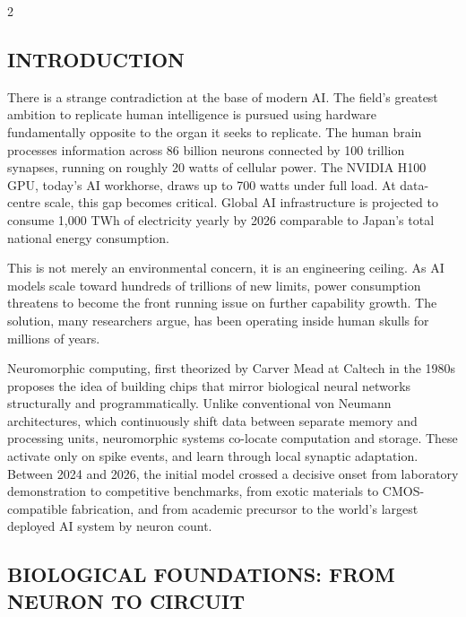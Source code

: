 \begin{multicols}{2}
\begin{abstract}
    \vspace{1em}
    {\justifying\noindent\textbf{Keywords:} Neuromorphic Computing, Spiking Neural Networks, Surrogate Gradient, MFT Training, SpikeYOLO, SpikingYOLOX, Memristor, ANN-to-SNN Conversion, Loihi 2, Hala Point, Event-Driven AI.\par}
  \end{abstract}

  \subsection*{\centering\uppercase{INTRODUCTION}}
  There is a strange contradiction at the base of modern AI. The field's greatest ambition to replicate human intelligence is pursued using hardware fundamentally opposite to the organ it seeks to replicate. The human brain processes information across 86 billion neurons connected by 100 trillion synapses, running on roughly 20 watts of cellular power. The NVIDIA H100 GPU, today's AI workhorse, draws up to 700 watts under full load. At data-centre scale, this gap becomes critical. Global AI infrastructure is projected to consume 1,000 TWh of electricity yearly by 2026 comparable to Japan's total national energy consumption.

  \noindent
  This is not merely an environmental concern, it is an engineering ceiling. As AI models scale toward hundreds of trillions of new limits, power consumption threatens to become the front running issue on further capability growth. The solution, many researchers argue, has been operating inside human skulls for millions of years.

  \noindent
  Neuromorphic computing, first theorized by Carver Mead at Caltech in the 1980s proposes the idea of building chips that mirror biological neural networks structurally and programmatically. Unlike conventional von Neumann architectures, which continuously shift data between separate memory and processing units, neuromorphic systems co-locate computation and storage. These activate only on spike events, and learn
  through local synaptic adaptation. Between 2024 and 2026, the initial model crossed a decisive onset from laboratory demonstration to competitive benchmarks, from exotic materials to CMOS-compatible fabrication, and from academic precursor to the world's largest deployed AI system by neuron count.

  \subsection*{\centering\uppercase{Biological Foundations: From Neuron to Circuit}}

\end{multicols}
